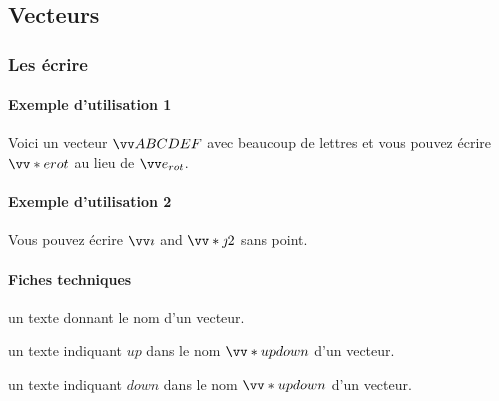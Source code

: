 \documentclass[12pt,a4paper]{article}
\begin{document}

\subsection{Vecteurs}

		\subsubsection{Les écrire}

\paragraph{Exemple d'utilisation 1}

\begin{tcblisting}{}
Voici un vecteur $\vect{ABCDEF}$ avec beaucoup de lettres et vous pouvez écrire
$\vect*{e}{rot}$ au lieu de $\vect{e_{rot}}$.
\end{tcblisting}


\paragraph{Exemple d'utilisation 2}

\begin{tcblisting}{}
Vous pouvez écrire $\vect{i}$ and $\vect*{j}{2}$ sans point.
\end{tcblisting}



\paragraph{Fiches techniques}


\IDarg{} un texte donnant le nom d'un vecteur.


\bigskip



 un texte indiquant $up$ dans le nom $\vect*{up}{down}$ d'un vecteur.

 un texte indiquant $down$ dans le nom $\vect*{up}{down}$ d'un vecteur.
\end{document}
